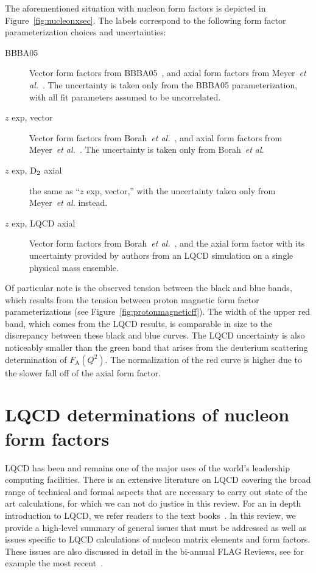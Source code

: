 \documentclass{ar-1col}
\begin{document}
The aforementioned situation with nucleon form factors is depicted in Figure~\ref{fig:nucleonxsec}.
The labels correspond to the following form factor parameterization choices and uncertainties:
\begin{description}
 \item[BBBA05] Vector form factors from BBBA05~\cite{Bradford:2006yz},
 and axial form factors from Meyer~{\it et al.}~\cite{Meyer:2016oeg}.
 The uncertainty is taken only from the BBBA05 parameterization,
 with all fit parameters assumed to be uncorrelated.
 \item[$z$ exp, vector] Vector form factors from Borah~{\it et al.}~\cite{Borah:2020gte},
 and axial form factors from Meyer~{\it et al.}~\cite{Meyer:2016oeg}.
 The uncertainty is taken only from Borah~{\it et al.}
 \item[$z$ exp, ${\rm D}_{2}$ axial] the same as ``$z$ exp, vector,''
 with the uncertainty taken only from Meyer~{\it et al.} instead.
 \item[$z$ exp, LQCD axial] Vector form factors from Borah~{\it et al.}~\cite{Borah:2020gte},
 and the axial form factor with its uncertainty
 provided by authors from an LQCD simulation on a single physical mass ensemble.
\end{description}
Of particular note is the observed tension between the black and blue bands,
 which results from the tension between proton magnetic form factor parameterizations
 (see Figure~\ref{fig:protonmagneticff}).
The width of the upper red band, which comes from the LQCD results,
is comparable in size to the discrepancy between these black and blue curves.
The LQCD uncertainty is also noticeably smaller than the green band that arises from the deuterium scattering determination of $F_{\mathrm{A}}(Q^2)$.
The normalization of the red curve is higher due to the slower fall off of the axial form factor.




\section{LQCD determinations of nucleon form factors\label{sec:lqcd}}

LQCD has been and remains one of the major uses of the world's leadership computing facilities.
There is an extensive literature on LQCD covering the broad range of technical and formal aspects that are necessary to carry out state of the art calculations, for which we can not do justice in this review.
For an in depth introduction to LQCD, we refer readers to the text books~\cite{Smit:2002ug,DeGrand:2006zz,Gattringer:2010zz}. In this review, we provide a high-level summary of general issues that must be addressed as well as issues specific to LQCD calculations of nucleon matrix elements and form factors.
These issues are also discussed in detail in the bi-annual FLAG Reviews, see for example the most recent~\cite{Aoki:2021kgd}.%
\begin{marginnote}
\end{marginnote}
\end{document}
